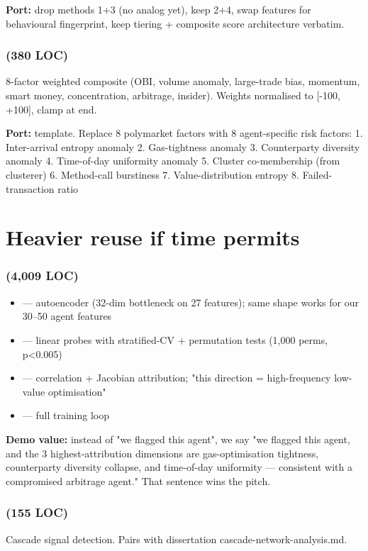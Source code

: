 \documentclass[11pt]{article}
\begin{document}
\textbf{Port:} drop methods 1+3 (no analog yet), keep 2+4, swap features for behavioural fingerprint, keep tiering + composite score architecture verbatim.

\subsubsection*{ (380 LOC)}
8-factor weighted composite (OBI, volume anomaly, large-trade bias, momentum, smart money, concentration, arbitrage, insider). Weights normalised to [-100, +100], clamp at end.

\textbf{Port:} template. Replace 8 polymarket factors with 8 agent-specific risk factors: 1. Inter-arrival entropy anomaly 2. Gas-tightness anomaly 3. Counterparty diversity anomaly 4. Time-of-day uniformity anomaly 5. Cluster co-membership (from clusterer) 6. Method-call burstiness 7. Value-distribution entropy 8. Failed-transaction ratio

\section{Heavier reuse if time permits}
\subsubsection*{ (4,009 LOC)}
\begin{itemize}
  \item {} --- autoencoder (32-dim bottleneck on 27 features); same shape works for our 30--50 agent features
  \item {} --- linear probes with stratified-CV + permutation tests (1,000 perms, p<0.005)
  \item {} --- correlation + Jacobian attribution; "this direction = high-frequency low-value optimisation"
  \item {} --- full training loop
\end{itemize}
\textbf{Demo value:} instead of "we flagged this agent", we say "we flagged this agent, and the 3 highest-attribution dimensions are gas-optimisation tightness, counterparty diversity collapse, and time-of-day uniformity --- consistent with a compromised arbitrage agent." That sentence wins the pitch.

\subsubsection*{ (155 LOC)}
Cascade signal detection. Pairs with dissertation cascade-network-analysis.md.
\end{document}
